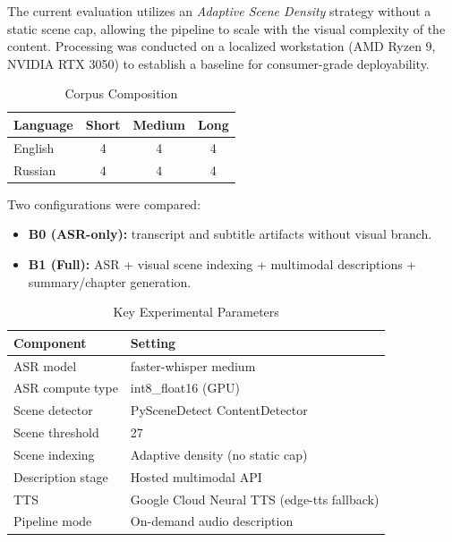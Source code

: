 \documentclass[conference]{IEEEtran}
\begin{document}
The current evaluation utilizes an \emph{Adaptive Scene Density} strategy without a static scene cap, allowing the pipeline to scale with the visual complexity of the content. Processing was conducted on a localized workstation (AMD Ryzen 9, NVIDIA RTX 3050) to establish a baseline for consumer-grade deployability.

\begin{table}[t]
\caption{Corpus Composition}
\label{tab:corpus_comp}
\centering
\footnotesize
\setlength{\tabcolsep}{5pt}
\begin{tabular}{lccc}
\toprule
\textbf{Language} & \textbf{Short} & \textbf{Medium} & \textbf{Long} \\
\midrule
English & 4 & 4 & 4 \\
Russian & 4 & 4 & 4 \\
\bottomrule
\end{tabular}
\end{table}

Two configurations were compared:
\begin{itemize}
\item \textbf{B0 (ASR-only):} transcript and subtitle artifacts without visual branch.
\item \textbf{B1 (Full):} ASR + visual scene indexing + multimodal descriptions + summary/chapter generation.
\end{itemize}

\begin{table}[t]
\caption{Key Experimental Parameters}
\label{tab:exp_params}
\centering
\footnotesize
\setlength{\tabcolsep}{4.5pt}
\begin{tabular}{ll}
\toprule
\textbf{Component} & \textbf{Setting} \\
\midrule
ASR model & faster-whisper medium \\
ASR compute type & int8\_float16 (GPU) \\
Scene detector & PySceneDetect ContentDetector \\
Scene threshold & 27 \\
Scene indexing & Adaptive density (no static cap) \\
Description stage & Hosted multimodal API \\
TTS & Google Cloud Neural TTS (edge-tts fallback) \\
Pipeline mode & On-demand audio description \\
\bottomrule
\end{tabular}
\end{table}
\end{document}
